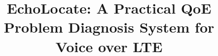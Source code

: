 \documentclass{sig-alternate-10pt}[10]
\begin{document}
\title{EchoLocate: A Practical QoE Problem Diagnosis System for Voice over LTE}
\iffalse
\numberofauthors{2}
\author{
}
\fi
\iffalse
\numberofauthors{8}
\author{
\alignauthor
Yunhan Jack Jia \\
	\affaddr{University of Michigan} \\
	\email{\normalsize alfchen@umich.edu} \\
\alignauthor
Qi Alfred Chen \\
	\affaddr{University of Michigan} \\
	\email{\normalsize alfchen@umich.edu} \\
\alignauthor
Z.~Morley Mao \\
	\affaddr{University of Michigan} \\
	\email{\normalsize haokun@umich.edu} \\
\alignauthor
Jie Hui \\
	\affaddr{University of Michigan} \\
	\affaddr{Ann Arbor, MI} \\
	\email{\normalsize sanae@umich.edu} \\
\alignauthor
Z. Morley Mao \\
        \affaddr{University of Michigan} \\
        \affaddr{Ann Arbor, MI} \\
	\email{\normalsize zmao@umich.edu} \\
\and
\alignauthor
Jie Hui \\
        \affaddr{T-mobile} \\
        \affaddr{Seattle, WA} \\
        \email{\normalsize jie.hui@t-mobile.com} \\
\alignauthor
Karthik Iyer \\
        \affaddr{T-mobile} \\
        \affaddr{Seattle, WA} \\
        \email{\normalsize karthik.iyer@t-mobile.com} \\
\alignauthor
Kevin Lau \\
        \affaddr{T-mobile} \\
        \affaddr{Seattle, WA} \\
        \email{\normalsize kevin.Lau@t-mobile.com} \\
}
\fi


\maketitle
\end{document}
